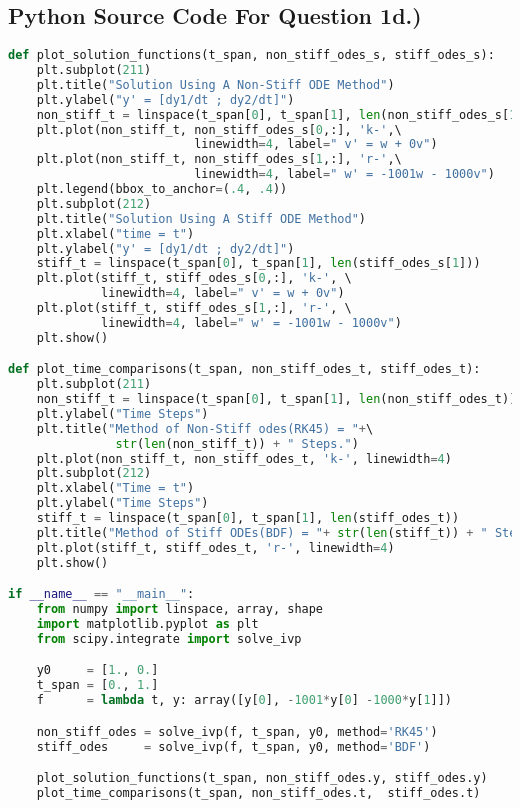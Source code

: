 \documentclass{article}
\begin{document}
\subsection*{Python Source Code For Question 1d.)}
\begin{lstlisting}[language=Python]
def plot_solution_functions(t_span, non_stiff_odes_s, stiff_odes_s):
    plt.subplot(211)
    plt.title("Solution Using A Non-Stiff ODE Method")
    plt.ylabel("y' = [dy1/dt ; dy2/dt]")
    non_stiff_t = linspace(t_span[0], t_span[1], len(non_stiff_odes_s[1]))
    plt.plot(non_stiff_t, non_stiff_odes_s[0,:], 'k-',\ 
                          linewidth=4, label=" v' = w + 0v")
    plt.plot(non_stiff_t, non_stiff_odes_s[1,:], 'r-',\ 
                          linewidth=4, label=" w' = -1001w - 1000v")
    plt.legend(bbox_to_anchor=(.4, .4))
    plt.subplot(212)
    plt.title("Solution Using A Stiff ODE Method")
    plt.xlabel("time = t")
    plt.ylabel("y' = [dy1/dt ; dy2/dt]")
    stiff_t = linspace(t_span[0], t_span[1], len(stiff_odes_s[1]))
    plt.plot(stiff_t, stiff_odes_s[0,:], 'k-', \ 
             linewidth=4, label=" v' = w + 0v")
    plt.plot(stiff_t, stiff_odes_s[1,:], 'r-', \ 
             linewidth=4, label=" w' = -1001w - 1000v")
    plt.show()

def plot_time_comparisons(t_span, non_stiff_odes_t, stiff_odes_t):
    plt.subplot(211)
    non_stiff_t = linspace(t_span[0], t_span[1], len(non_stiff_odes_t))
    plt.ylabel("Time Steps")
    plt.title("Method of Non-Stiff odes(RK45) = "+\ 
               str(len(non_stiff_t)) + " Steps.")
    plt.plot(non_stiff_t, non_stiff_odes_t, 'k-', linewidth=4)
    plt.subplot(212)
    plt.xlabel("Time = t")
    plt.ylabel("Time Steps")
    stiff_t = linspace(t_span[0], t_span[1], len(stiff_odes_t))
    plt.title("Method of Stiff ODEs(BDF) = "+ str(len(stiff_t)) + " Steps.")
    plt.plot(stiff_t, stiff_odes_t, 'r-', linewidth=4)
    plt.show()

if __name__ == "__main__":
    from numpy import linspace, array, shape
    import matplotlib.pyplot as plt
    from scipy.integrate import solve_ivp

    y0     = [1., 0.]
    t_span = [0., 1.]
    f      = lambda t, y: array([y[0], -1001*y[0] -1000*y[1]])

    non_stiff_odes = solve_ivp(f, t_span, y0, method='RK45')
    stiff_odes     = solve_ivp(f, t_span, y0, method='BDF')

    plot_solution_functions(t_span, non_stiff_odes.y, stiff_odes.y)
    plot_time_comparisons(t_span, non_stiff_odes.t,  stiff_odes.t)
\end{lstlisting}
\end{document}
